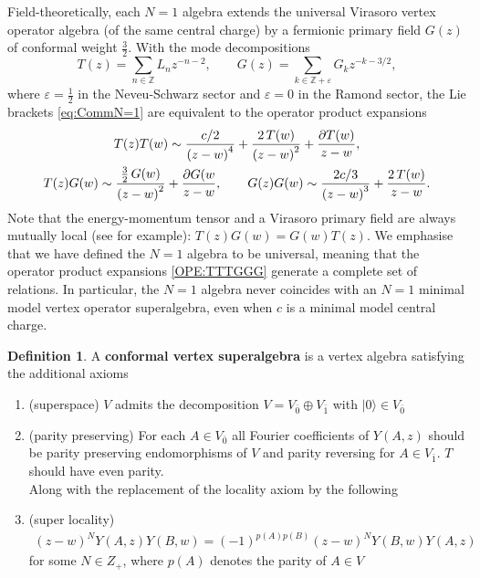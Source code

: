 \documentclass[a4paper,reqno,12pt]{report}
\theoremstyle{definition}
\newtheorem{defn}{Definition}[section]
\newcommand{\ket}{\rangle}
\numberwithin{equation}{section}
\let\originalleft\left     %
\let\originalright\right
\renewcommand{\left}{\mathopen{}\mathclose\bgroup\originalleft}
\renewcommand{\right}{\aftergroup\egroup\originalright}
\newcommand{\brac}[1]{\left( #1 \right)}
\newcommand{\ZZ}{\mathbb{Z}}
\newcommand{\pd}{\partial}         %
\newcommand{\opes}{operator product expansions}
\newcommand{\ns}{Neveu-Schwarz}
\newcommand{\eps}{\varepsilon}
\theoremstyle{plain}
\begin{document}
Field-theoretically, each $N=1$ algebra extends the universal Virasoro vertex operator algebra (of the same central charge) by a fermionic primary field $G(z)$ of conformal weight $\frac{3}{2}$.  With the mode decompositions
\begin{equation} \label{eq:TGFourier}
T(z) = \sum_{n \in \ZZ} L_n z^{-n-2}, \qquad 
G(z) = \sum_{k \in \ZZ + \eps} G_k z^{-k-3/2},
\end{equation}
where $\eps = \frac{1}{2}$ in the \ns{} sector and $\eps = 0$ in the Ramond sector, the Lie brackets \eqref{eq:CommN=1} are equivalent to the \opes{}
\begin{equation} \label{OPE:TTTGGG}
\begin{gathered}
T(z) T(w) \sim \frac{c/2}{\brac{z-w}^4} + \frac{2 \, T(w)}{\brac{z-w}^2} + \frac{\pd T(w)}{z-w}, \\
T(z) G(w) \sim \frac{\frac{3}{2} \, G(w)}{\brac{z-w}^2} + \frac{\pd G(w}{z-w}, \qquad 
G(z) G(w) \sim \frac{2c/3}{\brac{z-w}^3} + \frac{2 \, T(w)}{z-w}.
\end{gathered}
\end{equation}
Note that the energy-momentum tensor and a Virasoro primary field are always mutually local (see \cite{RidLog07} for example):  $T(z) G(w) = G(w) T(z)$.  We emphasise that we have defined the $N=1$ algebra to be universal, meaning that the \opes{} \eqref{OPE:TTTGGG} generate a complete set of relations.  In particular, the $N=1$ algebra never coincides with an $N=1$ minimal model vertex operator superalgebra, even when $c$ is a minimal model central charge.
\begin{defn}
A {\bf conformal vertex superalgebra} is a vertex algebra satisfying the additional axioms
\begin{enumerate}
\item (superspace) $V$ admits the decomposition $V = V_{\bar{0}}\oplus V_{\bar{1}}$ with $|0\ket \in V_{\bar{0}}$
\item (parity preserving) For each $A\in V_{\bar{0}}$ all Fourier coefficients of $Y(A,z)$ should be parity preserving endomorphisms of $V$ and parity reversing for $A\in V_{\bar{1}}$. $T$ should have even parity.\\
Along with the replacement of the locality axiom by the following
\item (super locality)
\begin{align*}
(z-w)^N Y(A,z) Y(B,w) =(-1)^{p(A)p(B)} (z-w)^N Y(B,w) Y(A,z)
\end{align*}
for some $N\in Z_+$, where $p(A)$ denotes the parity of $A\in V$
\end{enumerate}
\end{defn}
\end{document}
